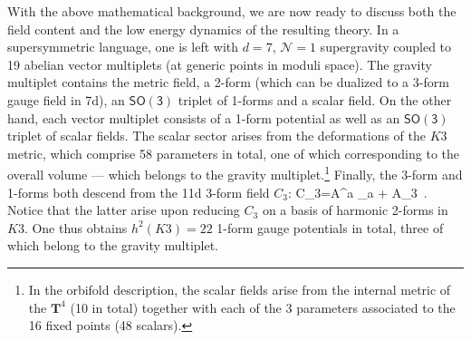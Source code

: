 With the above mathematical background, we are now ready to discuss both the field content and the low energy dynamics of the resulting theory. In a supersymmetric language, one is left with $d=7$, $\mathcal{N}=1$ supergravity coupled to 19 abelian vector multiplets (at generic points in moduli space). The gravity multiplet contains the metric field, a 2-form (which can be dualized to a 3-form gauge field in 7d), an $\mathsf{SO(3)}$ triplet of 1-forms and a scalar field. On the other hand, each vector multiplet consists of a 1-form potential as well as an $\mathsf{SO(3)}$ triplet of scalar fields. The scalar sector arises from the deformations of the $K3$ metric, which comprise 58 parameters in total, one of which corresponding to the overall volume --- which belongs to the gravity multiplet.\footnote{In the orbifold description, the scalar fields arise from the internal metric of the $\mathbf{T}^4$ (10 in total) together with each of the 3 parameters associated to the 16 fixed points (48 scalars).} Finally, the 3-form and 1-forms both descend from the 11d 3-form field $C_3$:
%
\beq\label{eq:7dreductionC3}
		C_3=A^a \wedge \omega_a + A_3\, .
\eeq
%
Notice that the latter arise upon reducing $C_3$ on a basis of harmonic 2-forms in $K3$. One thus obtains $h^2(K3)=22$ 1-form gauge potentials in total, three of which belong to the gravity multiplet.

